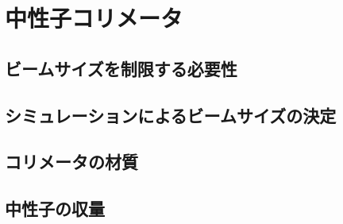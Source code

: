 \chapter{中性子コリメータ}
\section{ビームサイズを制限する必要性}
\section{シミュレーションによるビームサイズの決定}
\section{コリメータの材質}
\section{中性子の収量}
